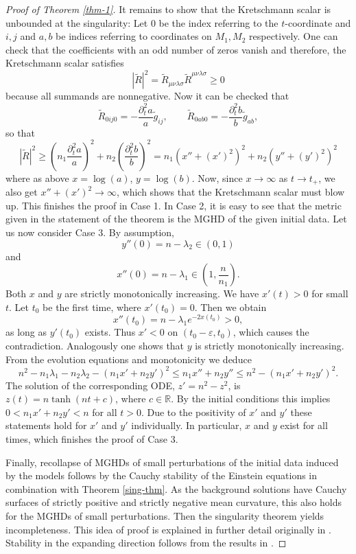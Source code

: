\documentclass[a4paper,10pt]{article}
\theoremstyle{plain}
\newtheorem{lem}[thm]{Lemma}
\theoremstyle{definition}
\theoremstyle{remark}
\theoremstyle{plain}
\newcommand{\R}{\mathbb{R}}
\newcommand{\eq}[1]{\begin{equation}#1\end{equation}}
\numberwithin{equation}{section}
\begin{document}
\begin{proof}[Proof of Theorem \ref{thm-1}]
It remains to show that the Kretschmann scalar is unbounded at the singularity:
 	 Let $0$ be the index referring to the $t$-coordinate and $i,j$ and $a,b$ be indices referring to coordinates on $M_1,M_2$ respectively. One can check that the coefficients with an odd number of zeros vanish and therefore, the Kretschmann scalar satisfies
 	\eq{ |\tilde{R}|^2=\tilde{R}_{\mu\nu\lambda\sigma}\tilde{R}^{\mu\nu\lambda\sigma}\geq 0}
 	because all summands are nonnegative. Now it can be checked that
 	\eq{ \tilde{R}_{0ij0}=-\frac{\partial^2_t a}{a} \tilde{g}_{ij},\qquad \tilde{R}_{0ab0}=-\frac{\partial^2_t b}{b} \tilde{g}_{ab},}
 	so that
 	\eq{|\tilde{R}|^2\geq \left(n_1\frac{\partial^2_t a}{a}\right)^2+n_2\left(\frac{\partial^2_t b}{b}\right)^2=n_1(x''+(x')^2)^2+n_2(y''+(y')^2)^2}
 	where as above $x=\log(a)$, $y=\log(b)$.
 	Now, since $x\to\infty$ as $t\to t_+$,
 we also get $x''+(x')^2\to\infty$, which shows that the Kretschmann scalar must blow up. This finishes the proof in Case 1. In Case 2, it is easy to see that the metric given in the statement of the theorem is the MGHD of the given initial data.
		Let us now consider Case 3. By assumption,
		\eq{
			y''(0)=n-\lambda_2\in(0,1)
		}
		and
		\eq{
			x''(0)=n-\lambda_1\in (1,\frac{n}{n_1}).
		}
		Both $x$ and $y$ are strictly monotonically increasing. We have $x'(t)>0$ for small $t$. Let $t_0$ be the first time, where $x'(t_0)=0$. Then  we obtain
		\eq{
			x''(t_0)=n-\lambda_1e^{-2x(t_0)}>0,
		}
		as long as $y'(t_0)$ exists. Thus $x'<0$ on $(t_0-\varepsilon,t_0)$, which causes the contradiction.
		Analogously one shows that $y$ is strictly monotonically increasing. From the evolution equations and monotonicity we deduce
		\eq{
			n^2-n_1\lambda_1-n_2\lambda_2-(n_1x'+n_2y')^2\leq n_1x''+n_2y''\leq n^2-(n_1x'+n_2y')^2.
		}
		The solution of the corresponding ODE, $z'=n^2-z^2$,
	 is $z(t)=n\tanh(nt+c)$, where $c\in \R$. By the initial conditions this implies $0<n_1x'+n_2y'<n$ for all $t>0$. Due to the positivity of $x'$ and $y'$ these statements hold for $x'$ and $y'$ individually.
		In particular, $x$ and $y$ exist for all times, which finishes the proof of Case 3.

Finally, recollapse of MGHDs of small perturbations of the initial data induced by the models follows by the Cauchy stability of the Einstein equations in combination with Theorem \ref{sing-thm}. As the background solutions have Cauchy surfaces of strictly positive and strictly negative mean curvature, this also holds for the MGHDs of small perturbations. Then the singularity theorem yields incompleteness. This idea of proof is explained in further detail originally in \cite{Ri09}. Stability in the expanding direction follows from the results in \cite{Ri08}.		
		\end{proof}
\end{document}
